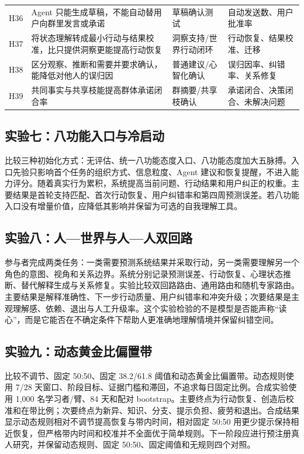 \documentclass[UTF8,a4paper,11pt]{ctexart}
\begin{document}
\begin{center}
\begin{longtable}{@{}p{1.4cm}p{4.5cm}p{5.2cm}p{3.4cm}@{}}
H36 & Agent 只能生成草稿，不能自动替用户向群里发言或承诺 & 草稿确认测试 & 自动发送数、用户批准率 \\
H37 & 将状态理解转成最小行动与结果校准，比只提供洞察更能提高行动恢复 & 洞察支持/世界行动闭环 & 行动恢复、结果校准、迁移 \\
H38 & 区分观察、推断和需要并要求确认，能降低对他人的误归因 & 普通建议/心智化确认 & 误归因率、纠错率、关系修复 \\
H39 & 共同事实与共享枝能提高群体承诺闭合率 & 群摘要/共享枝确认 & 承诺闭合、决策闭合、未解决问题 \\
\bottomrule
\end{longtable}
\end{center}


\subsection{实验七：八功能入口与冷启动}

比较三种初始化方式：无评估、统一八功能态度入口、八功能态度加大五脉搏。入口先验只影响首个任务的组织方式、信息粒度、Agent 建议和恢复提醒，不进入能力评分。随着真实行为累积，系统提高当前问题、行动结果和用户纠正的权重。主要结果是首轮支持匹配、首次行动恢复、用户纠错率和第四周预测误差。若八功能入口没有增量价值，应降低其影响并保留为可选的自我理解工具。

\subsection{实验八：人—世界与人—人双回路}

参与者完成两类任务：一类需要预测系统结果并采取行动，另一类需要理解另一个角色的意图、视角和关系边界。系统分别记录预测误差、行动恢复、心理状态推断、替代解释生成与关系修复。实验比较双回路路由、通用路由和随机专家路由。主要结果是解释准确性、下一步行动质量、用户纠错率和冲突升级；次要结果是主观理解感、依赖、退出与人工升级率。这个实验检验的不是模型是否能声称“读心”，而是它能否在不确定条件下帮助人更准确地理解情境并保留纠错空间。

\subsection{实验九：动态黄金比偏置带}

比较不调节、固定 50:50、固定 38.2/61.8 阈值和动态黄金比偏置带。动态规则使用 7/28 天窗口、阶段目标、证据门槛和滞回，不追求每日固定比例。合成实验使用 1,000 名学习者/臂、84 天和配对 bootstrap。主要终点为行动恢复、创造后校准和在带比例；次要终点为新异、知识、分支、提示负担、疲劳和退出。合成结果显示动态规则相对不调节提高恢复与带内时间，相对固定 50:50 用更少提示保持相近恢复，但严格带内时间和校准并不全面优于简单规则。下一阶段应进行预注册真人研究，并保留动态规则、固定 50:50、固定阈值和无规则四个对照。
\end{document}
